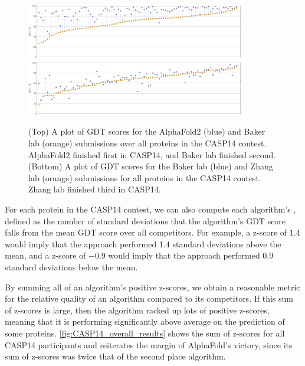 \begin{figure}[h]
	\centering
	\mySfFamily
	\includegraphics[width = 0.85\textwidth]{../images/AlphaFold2_BAKER.png}\\[4ex]
	\includegraphics[width = 0.85\textwidth]{../images/BAKER_Zhang.png}
	\caption{(Top) A plot of GDT scores for the AlphaFold2 (blue) and Baker lab (orange) submissions over all proteins in the CASP14 contest. AlphaFold2 finished first in CASP14, and Baker lab finished second. (Bottom) A plot of GDT scores for the Baker lab (blue) and Zhang lab (orange) submissions for all proteins in the CASP14 contest. Zhang lab finished third in CASP14.}
	\label{fig:AlphaFold2_BAKER_Zhang}
\end{figure}

For each protein in the CASP14 contest, we can also compute each algorithm's , defined as the number of standard deviations that the algorithm's GDT score falls from the mean GDT score over all competitors. For example, a z-score of 1.4 would imply that the approach performed 1.4 standard deviations above the mean, and a z-score of $-0.9$ would imply that the approach performed 0.9 standard deviations below the mean.

By summing all of an algorithm's positive z-scores, we obtain a reasonable metric for the relative quality of an algorithm compared to its competitors. If this sum of z-scores is large, then the algorithm racked up lots of positive z-scores, meaning that it is performing significantly above average on the prediction of some proteins. \autoref{fig:CASP14_overall_results} shows the sum of z-scores for all CASP14 participants and reiterates the margin of AlphaFold's victory, since its sum of z-scores was twice that of the second place algorithm.

